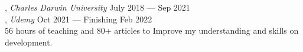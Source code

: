 
, \textit{Charles Darwin University}	\hfill July 2018 --- Sep 2021 \\
, \textit{Udemy}	\hfill Oct 2021 --- Finishing Feb 2022 \\
56 hours of teaching and 80+ articles to Improve my understanding and skills on development. \\
